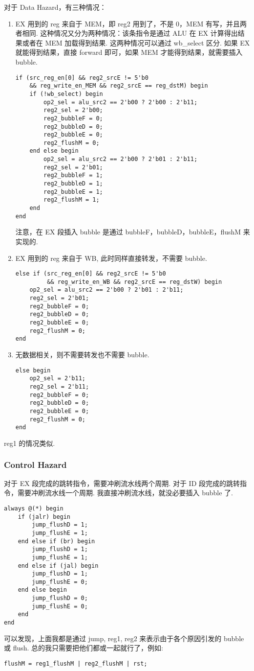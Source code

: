 \documentclass{article}
\begin{document}
对于 Data Hazard，有三种情况：
\begin{enumerate}
  \item
    EX 用到的 reg 来自于 MEM，即 reg2 用到了，不是 0，MEM 有写，并且两者相同. 这种情况又分为两种情况：该条指令是通过 ALU 在 EX 计算得出结果或者在 MEM 加载得到结果. 这两种情况可以通过 wb\_select 区分. 如果 EX 就能得到结果，直接 forward 即可，如果 MEM 才能得到结果，就需要插入 bubble.
    \begin{verbatim}
if (src_reg_en[0] && reg2_srcE != 5'b0
    && reg_write_en_MEM && reg2_srcE == reg_dstM) begin
    if (!wb_select) begin
        op2_sel = alu_src2 == 2'b00 ? 2'b00 : 2'b11;
        reg2_sel = 2'b00;
        reg2_bubbleF = 0;
        reg2_bubbleD = 0;
        reg2_bubbleE = 0;
        reg2_flushM = 0;
    end else begin
        op2_sel = alu_src2 == 2'b00 ? 2'b01 : 2'b11;
        reg2_sel = 2'b01;
        reg2_bubbleF = 1;
        reg2_bubbleD = 1;
        reg2_bubbleE = 1;
        reg2_flushM = 1;
    end
end
    \end{verbatim}
    注意，在 EX 段插入 bubble 是通过 bubbleF，bubbleD，bubbleE，flushM 来实现的.
  \item
    EX 用到的 reg 来自于 WB, 此时同样直接转发，不需要 bubble.
    \begin{verbatim}
else if (src_reg_en[0] && reg2_srcE != 5'b0
         && reg_write_en_WB && reg2_srcE == reg_dstW) begin
    op2_sel = alu_src2 == 2'b00 ? 2'b01 : 2'b11;
    reg2_sel = 2'b01;
    reg2_bubbleF = 0;
    reg2_bubbleD = 0;
    reg2_bubbleE = 0;
    reg2_flushM = 0;
end
    \end{verbatim}
  \item
    无数据相关，则不需要转发也不需要 bubble.
    \begin{verbatim}
else begin
    op2_sel = 2'b11;
    reg2_sel = 2'b11;
    reg2_bubbleF = 0;
    reg2_bubbleD = 0;
    reg2_bubbleE = 0;
    reg2_flushM = 0;
end
    \end{verbatim}
\end{enumerate}
reg1 的情况类似.
\subsubsection{Control Hazard}
对于 EX 段完成的跳转指令，需要冲刷流水线两个周期. 对于 ID 段完成的跳转指令，需要冲刷流水线一个周期. 我直接冲刷流水线，就没必要插入 bubble 了.
\begin{verbatim}
always @(*) begin
    if (jalr) begin
        jump_flushD = 1;
        jump_flushE = 1;
    end else if (br) begin
        jump_flushD = 1;
        jump_flushE = 1;
    end else if (jal) begin
        jump_flushD = 1;
        jump_flushE = 0;
    end else begin
        jump_flushD = 0;
        jump_flushE = 0;
    end
end
\end{verbatim}
可以发现，上面我都是通过 jump, reg1, reg2 来表示由于各个原因引发的 bubble 或 flush. 总的我只需要把他们都或一起就行了，例如:
\begin{verbatim}
flushM = reg1_flushM | reg2_flushM | rst;
\end{verbatim}
\end{document}
